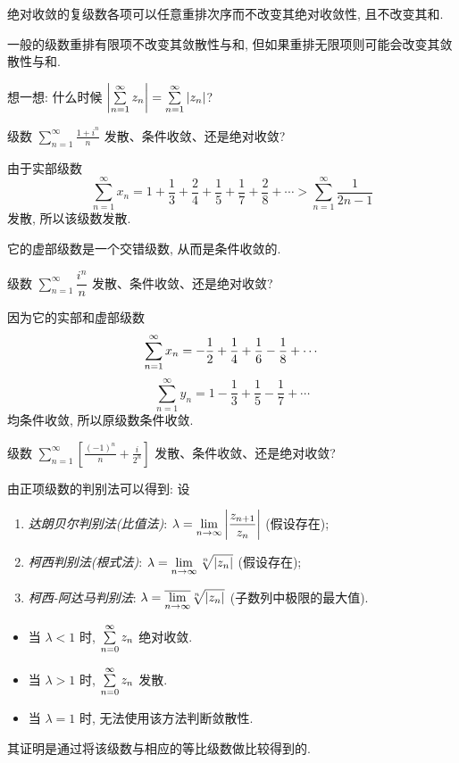 绝对收敛的复级数各项可以任意重排次序而不改变其绝对收敛性, 且不改变其和.

一般的级数重排有限项不改变其敛散性与和, 但如果重排无限项则可能会改变其敛散性与和.

想一想: 什么时候 $\left|\sum\limits_{n=1}^\infty z_n\right|=\sum\limits_{n=1}^\infty|z_n|$?

\begin{example}
	级数 $\displaystyle\sum_{n=1}^\infty\frac{1+i^n}n$ 发散、条件收敛、还是绝对收敛?
\end{example}

\begin{solution}
	由于实部级数
	\[\sum_{n=1}^\infty x_n=
	1+\frac13+\frac24+\frac15+\frac17+\frac28+\cdots>\sum_{n=1}^\infty\frac1{2n-1}\]
	发散, 所以该级数发散.
\end{solution}

它的虚部级数是一个交错级数, 从而是条件收敛的.

\begin{example}
	级数 $\displaystyle\sum_{n=1}^\infty\dfrac{i^n}n$ 发散、条件收敛、还是绝对收敛?
\end{example}

\begin{solution}
	因为它的实部和虚部级数
	\[\sum_{n=1}^\infty x_n=-\frac{1}{2} +\frac14+\frac16-\frac18+\cdots\]
{
	\[\sum_{n=1}^\infty y_n=1-\frac13+\frac15-\frac17+\cdots\]
	均条件收敛,
}{所以原级数条件收敛.}
\end{solution}

\begin{exercise}
	级数 $\displaystyle\sum_{n=1}^\infty\left[\frac{(-1)^n}n+\frac i{2^n}\right]$ 发散、条件收敛、还是绝对收敛?
\end{exercise}

由正项级数的判别法可以得到:
设
\begin{enumerate}
	\item \emph{达朗贝尔判别法(比值法)}: $\lambda=\displaystyle\lim_{n\to\infty}\left|\frac{z_{n+1}}{z_n}\right|$ (假设存在);
	\item \emph{柯西判别法(根式法)}: $\lambda=\displaystyle\lim_{n\to\infty}\sqrt[n]{\left|z_n\right|}$ (假设存在);
	\item \emph{柯西-阿达马判别法}: $\lambda=\displaystyle\overline{\lim_{n\to\infty}}\sqrt[n]{\left|z_n\right|}$ (子数列中极限的最大值).
\end{enumerate}

\begin{itemize}
	\item 当 $\lambda<1$ 时, $\sum\limits_{n=0}^\infty z_n$ 绝对收敛.
	\item 当 $\lambda>1$ 时, $\sum\limits_{n=0}^\infty z_n$ 发散.
	\item 当 $\lambda=1$ 时, 无法使用该方法判断敛散性.
\end{itemize}
其证明是通过将该级数与相应的等比级数做比较得到的.

